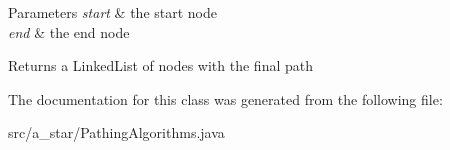 \begin{DoxyParams}{Parameters}
{\em start} & the start node \\
\hline
{\em end} & the end node \\
\hline
\end{DoxyParams}
\begin{DoxyReturn}{Returns}
a Linked\-List of nodes with the final path 
\end{DoxyReturn}


The documentation for this class was generated from the following file\-:\begin{DoxyCompactItemize}
\item 
src/a\-\_\-star/Pathing\-Algorithms.\-java\end{DoxyCompactItemize}
